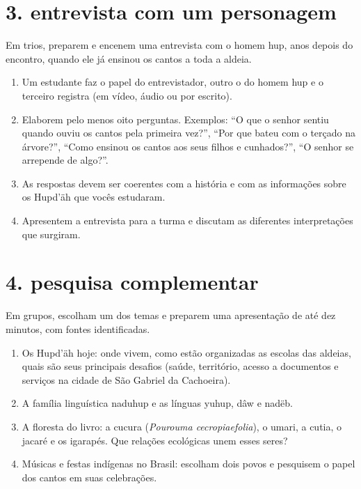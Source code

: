 \section{3. entrevista com um personagem}

Em trios, preparem e encenem uma entrevista com o homem hup, anos depois
do encontro, quando ele já ensinou os cantos a toda a aldeia.

\begin{enumerate}[label=\arabic*.]
\item Um estudante faz o papel do entrevistador, outro o do homem hup e
o terceiro registra (em vídeo, áudio ou por escrito).
\item Elaborem pelo menos oito perguntas. Exemplos: ``O que o senhor
sentiu quando ouviu os cantos pela primeira vez?'', ``Por que bateu com
o terçado na árvore?'', ``Como ensinou os cantos aos seus filhos e
cunhados?'', ``O senhor se arrepende de algo?''.
\item As respostas devem ser coerentes com a história e com as
informações sobre os Hupd'äh que vocês estudaram.
\item Apresentem a entrevista para a turma e discutam as diferentes
interpretações que surgiram.
\end{enumerate}

\section{4. pesquisa complementar}

Em grupos, escolham um dos temas e preparem uma apresentação de até dez
minutos, com fontes identificadas.

\begin{enumerate}[label=\alph*)]
\item Os Hupd'äh hoje: onde vivem, como estão organizadas as escolas das
aldeias, quais são seus principais desafios (saúde, território, acesso a
documentos e serviços na cidade de São Gabriel da Cachoeira).
\item A família linguística naduhup e as línguas yuhup, dâw e nadëb.
\item A floresta do livro: a cucura (\textit{Pourouma cecropiaefolia}),
o umari, a cutia, o jacaré e os igarapés. Que relações ecológicas unem
esses seres?
\item Músicas e festas indígenas no Brasil: escolham dois povos e
pesquisem o papel dos cantos em suas celebrações.
\end{enumerate}

